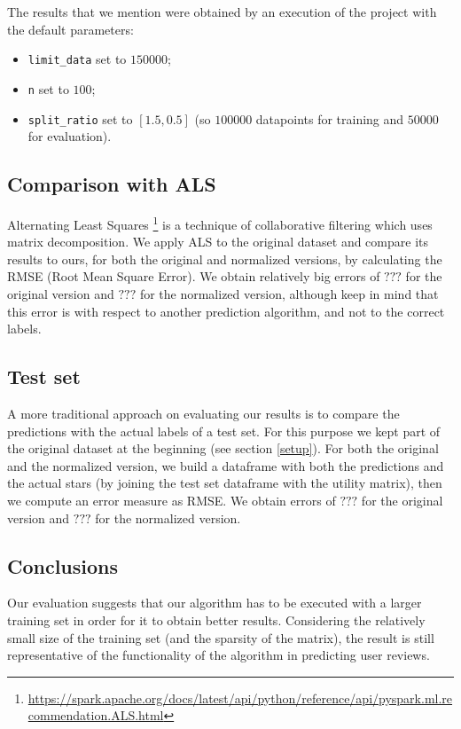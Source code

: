 \documentclass[11pt,a4paper]{article}
\newcommand{\code}{\texttt}
\begin{document}
\begin{multicols}{2}
The results that we mention were obtained by an execution of the project with the default parameters:
\begin{itemize}
	\item \code{limit\_data} set to $150 000$;
	\item \code{n} set to $100$;
	\item \code{split\_ratio} set to $[1.5, 0.5]$ (so $100 000$ datapoints for training and $50 000$ for evaluation).
\end{itemize}


\subsection{Comparison with ALS}
Alternating Least Squares \footnote{\url{https://spark.apache.org/docs/latest/api/python/reference/api/pyspark.ml.recommendation.ALS.html}} is a technique of collaborative filtering which uses matrix decomposition.
We apply ALS to the original dataset and compare its results to ours, for both the original and normalized versions, by calculating the RMSE (Root Mean Square Error).
We obtain relatively big errors of $???$ for the original version and $???$ for the normalized version, although keep in mind that this error is with respect to another prediction algorithm, and not to the correct labels.


\subsection{Test set}
A more traditional approach on evaluating our results is to compare the predictions with the actual labels of a test set.
For this purpose we kept part of the original dataset at the beginning (see section \ref{setup}).
For both the original and the normalized version, we build a dataframe with both the predictions and the actual stars (by joining the test set dataframe with the utility matrix), then we compute an error measure as RMSE.
We obtain errors of $???$ for the original version and $???$ for the normalized version.



\subsection{Conclusions}
Our evaluation suggests that our algorithm has to be executed with a larger training set in order for it to obtain better results.
Considering the relatively small size of the training set (and the sparsity of the matrix), the result is still representative of the functionality of the algorithm in predicting user reviews.




\end{multicols}
\end{document}
